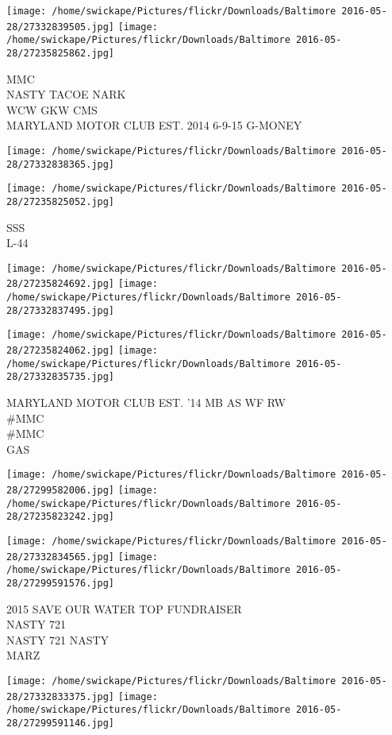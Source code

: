 \documentclass[10pt,letterpaper]{article}
\begin{document}
\texttt{[image: /home/swickape/Pictures/flickr/Downloads/Baltimore 2016-05-28/27332839505.jpg]}
\texttt{[image: /home/swickape/Pictures/flickr/Downloads/Baltimore 2016-05-28/27235825862.jpg]}

MMC\\
NASTY TACOE NARK\\
WCW GKW CMS\\
MARYLAND MOTOR CLUB EST. 2014 6{-}9{-}15 G{-}MONEY
\pagebreak

\texttt{[image: /home/swickape/Pictures/flickr/Downloads/Baltimore 2016-05-28/27332838365.jpg]}

\vspace{0.25in}
\texttt{[image: /home/swickape/Pictures/flickr/Downloads/Baltimore 2016-05-28/27235825052.jpg]}

SSS\\
L{-}44
\pagebreak

\texttt{[image: /home/swickape/Pictures/flickr/Downloads/Baltimore 2016-05-28/27235824692.jpg]}
\texttt{[image: /home/swickape/Pictures/flickr/Downloads/Baltimore 2016-05-28/27332837495.jpg]}

\texttt{[image: /home/swickape/Pictures/flickr/Downloads/Baltimore 2016-05-28/27235824062.jpg]}
\texttt{[image: /home/swickape/Pictures/flickr/Downloads/Baltimore 2016-05-28/27332835735.jpg]}

MARYLAND MOTOR CLUB EST. '14 MB AS WF RW\\
\#MMC\\
\#MMC\\
GAS
\pagebreak

\texttt{[image: /home/swickape/Pictures/flickr/Downloads/Baltimore 2016-05-28/27299582006.jpg]}
\texttt{[image: /home/swickape/Pictures/flickr/Downloads/Baltimore 2016-05-28/27235823242.jpg]}

\texttt{[image: /home/swickape/Pictures/flickr/Downloads/Baltimore 2016-05-28/27332834565.jpg]}
\texttt{[image: /home/swickape/Pictures/flickr/Downloads/Baltimore 2016-05-28/27299591576.jpg]}

2015 SAVE OUR WATER TOP FUNDRAISER\\
NASTY 721\\
NASTY 721 NASTY\\
MARZ
\pagebreak

\texttt{[image: /home/swickape/Pictures/flickr/Downloads/Baltimore 2016-05-28/27332833375.jpg]}
\texttt{[image: /home/swickape/Pictures/flickr/Downloads/Baltimore 2016-05-28/27299591146.jpg]}
\end{document}
